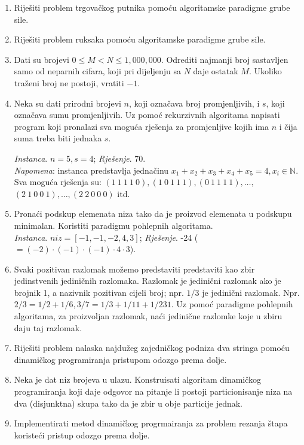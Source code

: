 \begin{enumerate}
	\item Riješiti problem trgovačkog putnika pomoću algoritamske paradigme grube sile.
	\item Riješiti problem ruksaka pomoću algoritamske paradigme grube sile.
	\item Dati  su brojevi  $0 \leq  M  <  N  \leq  1,000,000$. Odrediti  najmanji  broj  sastavljen  samo  od 
	neparnih cifara, koji pri dijeljenju sa $N$ daje ostatak $M$. Ukoliko traženi broj ne postoji, vratiti $−1$. 
	
	 \item Neka su dati prirodni brojevi $n$, koji označava broj promjenljivih, i $s$, koji označava sumu promjenljivih. Uz
pomoć rekurzivnih algoritama napisati program koji pronalazi sva moguća rješenja
za promjenljive  kojih ima $n$ i  čija   suma treba biti jednaka $ s$. 

\textit{Instanca}. $n = 5, s = 4$;
\textit{Rješenje}. 70. \\
\textit{Napomena}:
instanca predstavlja jednačinu $x_1 + x_2 + x_3 + x_4 + x_5 = 4, x_i \in \mathbb{N}$. 
Sva moguća rješenja su:
$(1\ 1\ 1\ 1\ 0), (1\ 0\ 1\ 1\ 1), (0\ 1\ 1\ 1\ 1), \ldots ,$ $(2\ 1\ 0\ 0\ 1), \ldots , (2\ 2\ 0\ 0\ 0)$ itd.
	\item Pronaći podskup elemenata niza tako da je proizvod elemenata u podskupu minimalan. Koristiti paradigmu pohlepnih algoritama.\\
	 \textit{Instanca}. $niz = [ -1, -1, -2, 4, 3]$; \textit{Rješenje}.  -24 ($=(-2 )\cdot (-1) \cdot (-1) \cdot 4 \cdot 3$). 
	
	\item Svaki pozitivan razlomak možemo predstaviti predstaviti kao zbir jedinstvenih jediničnih razlomaka. Razlomak je jedinični razlomak ako je brojnik 1, a nazivnik pozitivan cijeli broj; npr. $1/3$ je jedinični razlomak. Npr. $2/3= 1/2 + 1/6, 3/7=1/3 + 1/11 + 1/231.$   Uz pomoć paradigme pohlepnih algoritama, za proizvoljan razlomak, naći jedinične razlomke koje u zbiru daju taj razlomak.  
	
	
	\item Riješiti problem nalaska najdužeg zajedničkog podniza dva stringa pomoću dinamičkog programiranja pristupom odozgo prema dolje. 
	
	\item Neka je dat niz brojeva u ulazu. Konstruisati algoritam dinamičkog programiranja koji daje odgovor na pitanje li postoji particionisanje niza na dva (disjunktna) skupa tako da je zbir u obje particije jednak.
	\item Implementirati metod dinamičkog progrmairanja  za problem rezanja štapa koristeći pristup odozgo prema dolje.
	

\end{enumerate}
